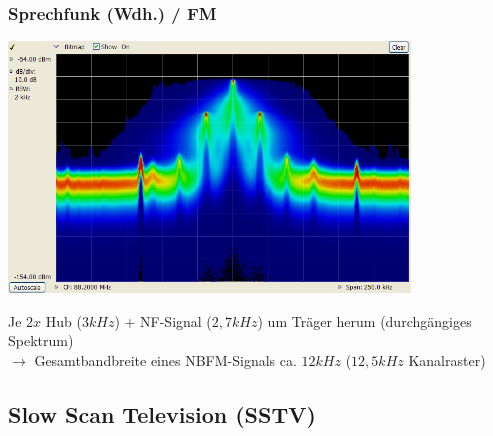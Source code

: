 \begin{frame}
    \frametitle{Sprechfunk (Wdh.) / FM}

    \begin{center}
        \includegraphics[width=0.8\textwidth]{e16/Dpx-fm-radio.png}
        \tiny \hyperlink{refs}{\cite{wc}}
    \end{center}

    Je $2x$ Hub ($3 kHz$) + NF-Signal ($2,7 kHz$) um Träger herum
    (durchgängiges Spektrum) \\[1em]
    
    $\rightarrow$ Gesamtbandbreite eines NBFM-Signals ca. $12 kHz$ ($12,5 kHz$
    Kanalraster)

\end{frame}

\subsection[SSTV]{Slow Scan Television (SSTV)}

